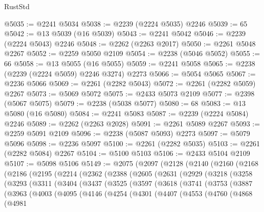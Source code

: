 \begin{lexlean}{RustStd}
\begin{coremodule}
@5035 := @2241 @5034
@5038 := @2239 (@2224 @5035) @2246
@5039 := 65
@5042 := @13 @5039 (@16 @5039)
@5043 := @2241 @5042
@5046 := @2239 (@2224 @5043) @2246
@5048 := @2262 (@2263 @2017)
@5050 := @2261 @5048 @2267
@5052 := @2259 @5050 @2109
@5054 := @2238 (@5046 @5052)
@5055 := 66
@5058 := @13 @5055 (@16 @5055)
@5059 := @2241 @5058
@5065 := @2238 (@2239 (@2224 @5059) @2246 @3274) @2273
@5066 := @5054 @5065
@5067 := @2236 @5066
@5069 := @2261 (@2282 @5043)
@5072 := @2261 (@2282 @5059) @2267
@5073 := @5069 @5072
@5075 := @2433 @5073 @2109
@5077 := @2398 (@5067 @5075)
@5079 := @2238 (@5038 @5077)
@5080 := 68
@5083 := @13 @5080 (@16 @5080)
@5084 := @2241 @5083
@5087 := @2239 (@2224 @5084) @2246
@5089 := @2262 (@2263 @2028)
@5091 := @2261 @5089 @2267
@5093 := @2259 @5091 @2109
@5096 := @2238 (@5087 @5093) @2273
@5097 := @5079 @5096
@5098 := @2236 @5097
@5100 := @2261 (@2282 @5035)
@5103 := @2261 (@2282 @5084) @2267
@5104 := @5100 @5103
@5106 := @2433 @5104 @2109
@5107 := @5098 @5106
@5149 := @2075
    (@2097
      (@2128
        (@2140
          (@2160
            (@2168
              (@2186
                (@2195
                  (@2214
                    (@2362
                      (@2388
                        (@2605
                          (@2631
                            (@2929
                              (@3218
                                (@3258
                                  (@3293
                                    (@3311
                                      (@3404
                                        (@3437
                                          (@3525
                                            (@3597
                                              (@3618
                                                (@3741
                                                  (@3753
                                                    (@3887
                                                      (@3963
                                                        (@4003
                                                          (@4095
                                                            (@4146
                                                              (@4254
                                                                (@4301
                                                                  (@4407
                                                                    (@4553
                                                                      (@4760
                                                                        (@4868
                                                                          (@4981

\end{coremodule}
\end{lexlean}
